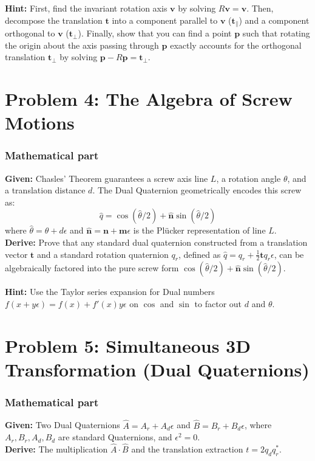 \documentclass[11pt]{article}
\begin{document}
\textbf{Hint:} First, find the invariant rotation axis $\mathbf{v}$ by solving $R\mathbf{v} = \mathbf{v}$. Then, decompose the translation $\mathbf{t}$ into a component parallel to $\mathbf{v}$ ($\mathbf{t}_{\parallel}$) and a component orthogonal to $\mathbf{v}$ ($\mathbf{t}_{\perp}$). Finally, show that you can find a point $\mathbf{p}$ such that rotating the origin about the axis passing through $\mathbf{p}$ exactly accounts for the orthogonal translation $\mathbf{t}_{\perp}$ by solving $\mathbf{p} - R\mathbf{p} = \mathbf{t}_{\perp}$.

\section*{Problem 4: The Algebra of Screw Motions}

\subsubsection*{Mathematical part}
\textbf{Given:} Chasles' Theorem guarantees a screw axis line $L$, a rotation angle $\theta$, and a translation distance $d$. The Dual Quaternion geometrically encodes this screw as:
$$ \hat{q} = \cos(\hat{\theta}/2) + \mathbf{\hat{n}}\sin(\hat{\theta}/2) $$
where $\hat{\theta} = \theta + d\epsilon$ and $\mathbf{\hat{n}} = \mathbf{n} + \mathbf{m}\epsilon$ is the Plücker representation of line $L$. \\
\textbf{Derive:} Prove that any standard dual quaternion constructed from a translation vector $\mathbf{t}$ and a standard rotation quaternion $q_r$, defined as $\hat{q} = q_r + \frac{1}{2}\mathbf{t}q_r\epsilon$, can be algebraically factored into the pure screw form $\cos(\hat{\theta}/2) + \mathbf{\hat{n}}\sin(\hat{\theta}/2)$. 

\textbf{Hint:} Use the Taylor series expansion for Dual numbers $f(x+y\epsilon) = f(x) + f'(x)y\epsilon$ on $\cos$ and $\sin$ to factor out $d$ and $\theta$.

\section*{Problem 5: Simultaneous 3D Transformation (Dual Quaternions)}

\subsubsection*{Mathematical part}
\textbf{Given:} Two Dual Quaternions $\hat{A} = A_r + A_d\epsilon$ and $\hat{B} = B_r + B_d\epsilon$, where $A_r, B_r, A_d, B_d$ are standard Quaternions, and $\epsilon^2 = 0$. \\
\textbf{Derive:} The multiplication $\hat{A} \cdot \hat{B}$ and the translation extraction $t = 2 q_d q_r^*$.
\end{document}
